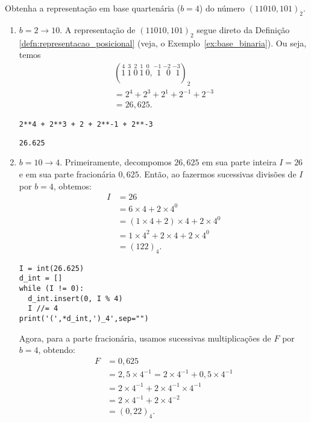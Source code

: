 \begin{ex}
  Obtenha a representação em base quartenária ($b=4$) do número $(11010,101)_2$.
  \begin{enumerate}[1.]
  \item $b=2 \to 10$. 
    A representação de $(11010,101)_2$ segue direto da Definição \ref{defn:representacao_posicional} (veja, o Exemplo~\ref{ex:base_binaria}). Ou seja, temos
    \begin{gather}
      (\stackrel{4}{1}~\stackrel{3}{1}~\stackrel{2}{0}~\stackrel{1}{1}~\stackrel{0}{0},\stackrel{-1}{~\,1}~\stackrel{-2}{~\,0}~\stackrel{-3}{~\,1})_2 \\
      = 2^4 + 2^3 + 2^1 + 2^{-1} + 2^{-3} \\
      = 26,625.
    \end{gather}

\begin{lstlisting}
2**4 + 2**3 + 2 + 2**-1 + 2**-3
\end{lstlisting}

\begin{verbatim}
26.625
\end{verbatim}

  \item $b=10 \to 4$.
    Primeiramente, decompomos $26,625$ em sua parte inteira $I = 26$ e em sua parte fracionária $0,625$. Então, ao fazermos sucessivas divisões de $I$ por $b=4$, obtemos:
    \begin{align}
      I &= 26\\
        &= 6\times 4 + 2\times 4^0\\
        &= (1\times 4 + 2)\times 4 + 2\times 4^0\\
        &= 1\times 4^2 + 2\times 4 + 2\times 4^0\\
        &= (122)_4.
    \end{align}

\begin{lstlisting}
I = int(26.625)
d_int = []
while (I != 0):
  d_int.insert(0, I % 4)
  I //= 4
print('(',*d_int,')_4',sep="")
\end{lstlisting}
    
    Agora, para a parte fracionária, usamos sucessivas multiplicações de $F$ por $b=4$, obtendo:
    \begin{align}
      F &= 0,625\\
        &= 2,5\times 4^{-1} = 2\times 4^{-1} + 0,5\times 4^{-1}\\
        &= 2\times 4^{-1} + 2\times 4^{-1}\times 4^{-1}\\
        &= 2\times 4^{-1} + 2\times 4^{-2}\\
        &= (0,22)_{4}.
    \end{align}


\end{enumerate}
\end{ex}
